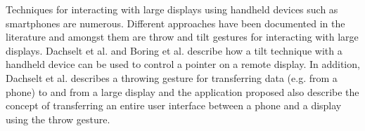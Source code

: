 Techniques for interacting with large displays using handheld devices such as smartphones are numerous.
Different approaches have been documented in the literature and amongst them are throw and tilt gestures for interacting with large displays.
Dachselt et al. \cite{Dachselt:2008} and Boring et al. \cite{Boring:2009} describe how a tilt technique with a handheld device can be used to control a pointer on a remote display.
In addition, Dachselt et al. describes a throwing gesture for transferring data (e.g. from a phone) to and from a large display and the application proposed also describe the concept of transferring an entire user interface between a phone and a display using the throw gesture.




